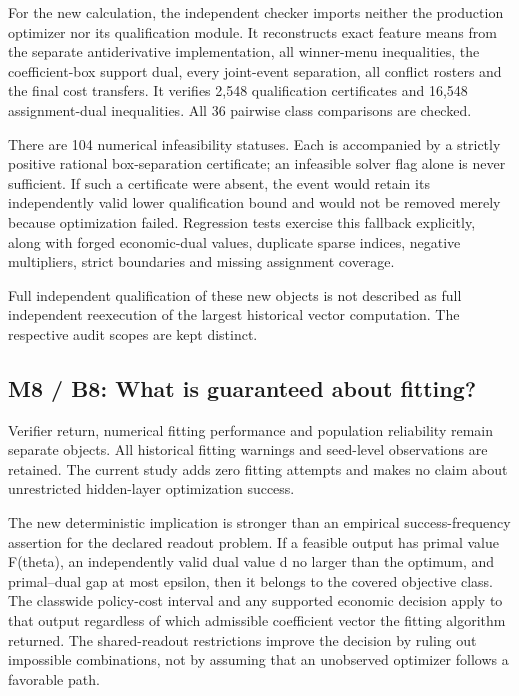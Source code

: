 For the new calculation, the independent checker imports neither the
production optimizer nor its qualification module. It reconstructs exact
feature means from the separate antiderivative implementation, all
winner-menu inequalities, the coefficient-box support dual, every
joint-event separation, all conflict rosters and the final cost
transfers. It verifies 2,548 qualification certificates and 16,548
assignment-dual inequalities. All 36 pairwise class comparisons are
checked.

There are 104 numerical infeasibility statuses. Each is accompanied by a
strictly positive rational box-separation certificate; an infeasible
solver flag alone is never sufficient. If such a certificate were
absent, the event would retain its independently valid lower
qualification bound and would not be removed merely because optimization
failed. Regression tests exercise this fallback explicitly, along with
forged economic-dual values, duplicate sparse indices, negative
multipliers, strict boundaries and missing assignment coverage.

Full independent qualification of these new objects is not described as
full independent reexecution of the largest historical vector
computation. The respective audit scopes are kept distinct.

\hypertarget{m8-b8-what-is-guaranteed-about-fitting}{%
\subsection{M8 / B8: What is guaranteed about
fitting?}\label{m8-b8-what-is-guaranteed-about-fitting}}

Verifier return, numerical fitting performance and population
reliability remain separate objects. All historical fitting warnings and
seed-level observations are retained. The current study adds zero
fitting attempts and makes no claim about unrestricted hidden-layer
optimization success.

The new deterministic implication is stronger than an empirical
success-frequency assertion for the declared readout problem. If a
feasible output has primal value F(theta), an independently valid dual
value d no larger than the optimum, and primal--dual gap at most
epsilon, then it belongs to the covered objective class. The classwide
policy-cost interval and any supported economic decision apply to that
output regardless of which admissible coefficient vector the fitting
algorithm returned. The shared-readout restrictions improve the decision
by ruling out impossible combinations, not by assuming that an
unobserved optimizer follows a favorable path.

